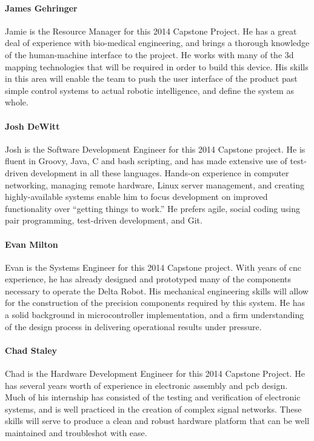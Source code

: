 \documentclass[11pt]{report}
\begin{document}
\paragraph{James Gehringer}
Jamie is the Resource Manager for this 2014 Capstone Project. He has a great deal of experience with bio-medical engineering, and brings a thorough knowledge of the human-machine interface to the project.
He works with many of the \gls{3d} mapping technologies that will be required in order to build this device.
His skills in this area will enable the team to push the user interface of the product past simple control systems to actual robotic intelligence, and define the system as whole.

\paragraph{Josh DeWitt}
Josh is the Software Development Engineer for this 2014 Capstone project.
He is fluent in Groovy, Java, C and bash scripting, and has made extensive use of test-driven development in all these languages.
Hands-on experience in computer networking, managing remote hardware, Linux server management, and creating highly-available systems enable him to focus development on improved functionality over “getting things to work.”
He prefers agile, social coding using pair programming, test-driven development, and Git. 

\paragraph{Evan Milton}
Evan is the Systems Engineer for this 2014 Capstone project.
With years of \gls{cnc} experience, he has already designed and prototyped many of the components necessary to operate the Delta Robot.
His mechanical engineering skills will allow for the construction of the precision components required by this system.
He has a solid background in microcontroller implementation, and a firm understanding of the design process in delivering operational results under pressure.

\paragraph{Chad Staley}
Chad is the Hardware Development Engineer for this 2014 Capstone Project.
He has several years worth of experience in electronic assembly and \gls{pcb} design.
Much of his internship has consisted of the testing and verification of electronic systems, and is well practiced in the creation of complex signal networks.
These skills will serve to produce a clean and robust hardware platform that can be well maintained and troubleshot with ease.
\end{document}
